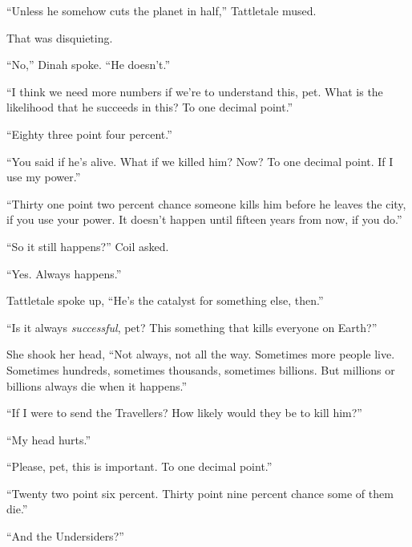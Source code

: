 ``Unless he somehow cuts the planet in half,'' Tattletale mused.



That was disquieting.



``No,'' Dinah spoke.  ``He doesn't.''



``I think we need more numbers if we're to understand this, pet.  What is the likelihood that he succeeds in this?  To one decimal point.''



``Eighty three point four percent.''



``You said if he's alive.  What if we killed him?  Now?  To one decimal point.  If I use my power.''



``Thirty one point two percent chance someone kills him before he leaves the city, if you use your power.  It doesn't happen until fifteen years from now, if you do.''



``So it still happens?'' Coil asked.



``Yes.  Always happens.''



Tattletale spoke up, ``He's the catalyst for something else, then.''



``Is it always \emph{successful}, pet?  This something that kills everyone on Earth?''



She shook her head, ``Not always, not all the way.  Sometimes more people live.  Sometimes hundreds, sometimes thousands, sometimes billions.  But millions or billions always die when it happens.''



``If I were to send the Travellers?  How likely would they be to kill him?''



``My head hurts.''



``Please, pet, this is important.  To one decimal point.''



``Twenty two point six percent.  Thirty point nine percent chance some of them die.''



``And the Undersiders?''



